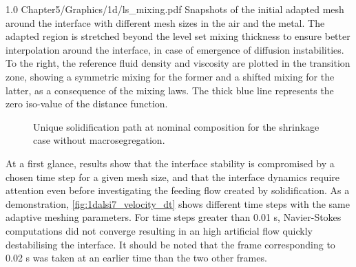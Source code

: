 \begin{figureth}
{1.0}
{Chapter5/Graphics/1d/ls_mixing.pdf}
{Snapshots of the initial adapted mesh around the interface with different mesh sizes in the air and the metal. The adapted region
is stretched beyond the level set mixing thickness to ensure better interpolation around the interface, in case of emergence of diffusion
instabilities. To the right, the reference fluid density and viscosity are plotted in the transition zone, showing a symmetric mixing for the former
and a shifted mixing for the latter, as a consequence of the mixing laws.
The thick blue line represents the zero iso-value of the distance function.}
\label{fig:1dalsi7_lsmixing}
\end{figureth}

\begin{figure}[htbp]
\centering
{}

\caption{Unique solidification path at nominal composition for the shrinkage case without macrosegregation.}
\label{fig:shrinkage_nomacro_sp}
\end{figure}

At a first glance, results show that the interface stability is compromised by a chosen time step for a given mesh size, and that the interface dynamics
require attention even before investigating the feeding flow created by solidification. As a demonstration, \cref{fig:1dalsi7_velocity_dt} shows different
time steps with the same adaptive meshing parameters. For time steps greater than 0.01 s, Navier-Stokes computations did not converge resulting in an high artificial 
flow quickly destabilising the interface. It should be noted that the frame corresponding to 0.02 s was taken at an earlier time than the two other frames.

